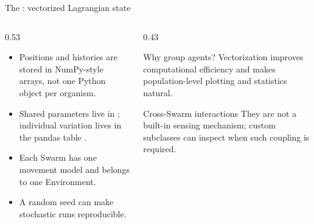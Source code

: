 \documentclass[aspectratio=169,11pt]{beamer}
\begin{document}
\begin{frame}{The : vectorized Lagrangian state}
\begin{columns}[T,onlytextwidth]
  \begin{column}{0.53\textwidth}
    \begin{itemize}
      \item Positions and histories are stored in NumPy-style arrays, not one Python object per organism.
      \item Shared parameters live in ; individual variation lives in the pandas table .
      \item Each Swarm has one movement model and belongs to one Environment.
      \item A random seed can make stochastic runs reproducible.
    \end{itemize}
  \end{column}
  \begin{column}{0.43\textwidth}
    \begin{block}{Why group agents?}
      Vectorization improves computational efficiency and makes population-level plotting and statistics natural.
    \end{block}
    \begin{alertblock}{Cross-Swarm interactions}
      They are not a built-in sensing mechanism; custom subclasses can inspect  when such coupling is required.
    \end{alertblock}
  \end{column}
\end{columns}
\end{frame}
\end{document}
